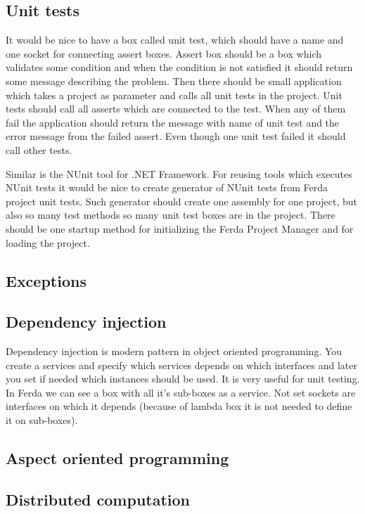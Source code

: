 \documentclass[a4paper,12pt]{book}
\begin{document}
\subsection{Unit tests}
It would be nice to have a box called unit test, which should have a name and one socket for connecting assert boxes. Assert box should be a box which validates some condition and when the condition is not satisfied it should return some message describing the problem. Then there should be small application which takes a project as parameter and calls all unit tests in the project. Unit tests should call all asserts which are connected to the test. When any of them fail the application should return the message with name of unit test and the error message from the failed assert. Even though one unit test failed it should call other tests.

Similar is the NUnit tool for .NET Framework. For reusing tools which executes NUnit tests it would be nice to create generator of NUnit tests from Ferda project unit tests. Such generator should create one assembly for one project, but also so many test methods so many unit test boxes are in the project. There should be one startup method for initializing the Ferda Project Manager and for loading the project. 

\subsection{Exceptions}
\subsection{Dependency injection}
Dependency injection is modern pattern in object oriented programming. You create a services and specify which services depends on which interfaces and later you set if needed which instances should be used. It is very useful for unit testing. In Ferda we can see a box with all it's sub-boxes as a service. Not set sockets are interfaces on which it depends (because of lambda box it is not needed to define it on sub-boxes).

\subsection{Aspect oriented programming}
\subsection{Distributed computation}
\end{document}
